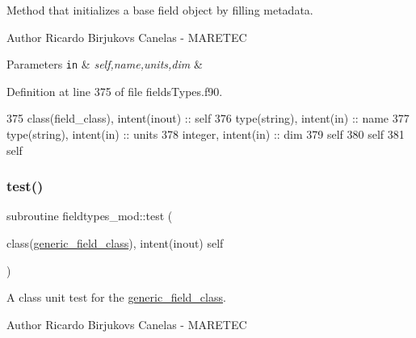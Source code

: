 Method that initializes a base field object by filling metadata. 

\begin{DoxyAuthor}{Author}
Ricardo Birjukovs Canelas -\/ M\+A\+R\+E\+T\+EC 
\end{DoxyAuthor}

\begin{DoxyParams}[1]{Parameters}
\mbox{\tt in}  & {\em self,name,units,dim} & \\
\hline
\end{DoxyParams}


Definition at line 375 of file fields\+Types.\+f90.


\begin{DoxyCode}
375     \textcolor{keywordtype}{class}(field\_class), \textcolor{keywordtype}{intent(inout)} :: self
376     \textcolor{keywordtype}{type}(string), \textcolor{keywordtype}{intent(in)} :: name
377     \textcolor{keywordtype}{type}(string), \textcolor{keywordtype}{intent(in)} :: units
378     \textcolor{keywordtype}{integer}, \textcolor{keywordtype}{intent(in)} :: dim
379     self%
380     self%
381     self%
\end{DoxyCode}
\mbox{\label{namespacefieldtypes__mod_a0babd6327ed77199d5437d17de34bafe}} 
\subsubsection{\texorpdfstring{test()}{test()}}
{\footnotesize\ttfamily subroutine fieldtypes\+\_\+mod\+::test (\begin{DoxyParamCaption}\item[{class(\mbox{\hyperlink{structfieldtypes__mod_1_1generic__field__class}{generic\+\_\+field\+\_\+class}}), intent(inout)}]{self }\end{DoxyParamCaption})\hspace{0.3cm}{\ttfamily [private]}}



A class \textquotesingle{}unit\textquotesingle{} test for the \mbox{\hyperlink{structfieldtypes__mod_1_1generic__field__class}{generic\+\_\+field\+\_\+class}}. 

\begin{DoxyAuthor}{Author}
Ricardo Birjukovs Canelas -\/ M\+A\+R\+E\+T\+EC 
\end{DoxyAuthor}


